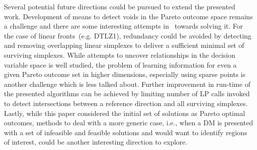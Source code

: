 Several potential future directions could be pursued to extend the presented work. Development of means to detect voids in the Pareto outcome space remains a challenge and there are some interesting attempts in~\cite{hartikainen2014paint} towards solving it. For the case of linear fronts~(e.g. DTLZ1), redundancy could be avoided by detecting and removing overlapping linear {\color{blue}simplexes} to deliver a sufficient minimal set of surviving {\color{blue}simplexes}. While attempts to uncover relationships in the decision variable space is well studied, the problem of learning information for even a given Pareto outcome set in higher dimensions, especially using sparse points is another challenge which is less talked about. Further improvement in run-time of the presented algorithms can be achieved by limiting number of LP calls invoked to detect intersections between a reference direction and all surviving {\color{blue}simplexes}. Lastly, while this paper considered the initial set of solutions as Pareto optimal outcomes, methods to deal with a more generic case, i.e., when a DM is presented with a set of infeasible and feasible solutions and would want to identify regions of interest, could be another interesting direction to explore. 
 

